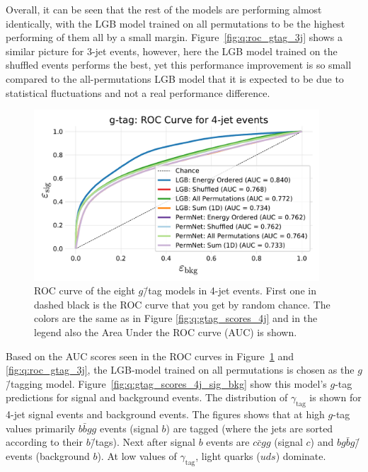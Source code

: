 Overall, it can be seen that the rest of the models are performing almost identically, with the LGB model trained on all permutations to be the highest performing of them all by a small margin. 
Figure~\ref{fig:q:roc_gtag_3j} shows a similar picture for 3-jet events, however, here the LGB model trained on the shuffled events performs the best, yet this performance improvement is so small compared to the all-permutations LGB model that it is expected to be due to statistical fluctuations and not a real performance difference. 

\begin{figure}[h!]
  \centerfloat
  \includegraphics[width=0.95\textwidth, trim=10 10 10 40, clip]{figures/quarks/gtag_ROC_4_jet-down_sample=1.00-ML_vars=vertex-selection=b-ejet_min=4-n_iter_RS_lgb=99-n_iter_RS_xgb=9-cdot_cut=0.90-version=19.pdf}
  \caption[ROC Curve for $g$\=/Tag in 4-Jet Events]
          {ROC curve of the eight $g$\=/tag models in 4-jet events. First one in dashed black is the ROC curve that you get by random chance. The colors are the same as in 
          Figure \ref{fig:q:gtag_scores_4j} 
          and in the legend also the Area Under the ROC curve (AUC) is shown.} 
  \label{fig:q:roc_gtag_4j_non_appendix}
\end{figure}

Based on the AUC scores seen in the ROC curves in Figure~\ref{fig:q:roc_gtag_4j_non_appendix} and \ref{fig:q:roc_gtag_3j}, the LGB-model trained on all permutations is chosen as the $g$\=/tagging model. Figure~\ref{fig:q:gtag_scores_4j_sig_bkg} show this model's $g$-tag predictions for signal and background events. The distribution of $\gamma_\mathrm{tag}$ is shown for 4-jet signal events and background events. The figures shows that at high $g$-tag values primarily $b\bar{b}gg$ events (signal $b$) are tagged (where the jets are sorted according to their $b$\=/tags). Next after signal $b$ events are $c\bar{c}gg$ (signal $c$) and $bg\bar{b}g$\=/events (background $b$). At low values of $\gamma_\mathrm{tag}$, light quarks ($uds$) dominate. 

